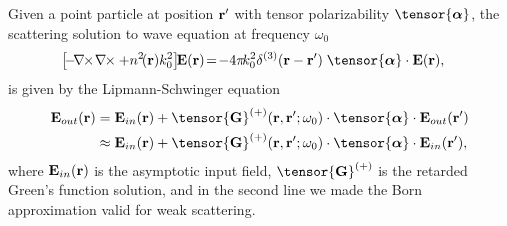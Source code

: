 \documentclass[preprint,aps,pra,onecolumn]{revtex4-1} %
\begin{document}
Given a point particle at position $\mathbf{r}'$ with tensor polarizability $\tensor{\boldsymbol{\alpha}}$, the  scattering solution to wave equation at frequency $\omega_0$
\begin{align}\label{eq:Maxwellwithsource2}
\left[\! -\! \nabla\!\!\times\!\nabla\!\!\times + n^2\!(\br)k_0^2 \right]\!\! \mathbf{E}(\br) &\!=\! -4\pi\! k_0^2 \delta^{(3)}(\br-\br')\;  \tensor{\boldsymbol{\alpha}}\cdot \mathbf{E}(\br),
\end{align}
is given by the Lipmann-Schwinger equation
\begin{align}
\mathbf{E}_{out}(\br) &=\mathbf{E}_{in}(\br)+\tensor{\mathbf{G}}^{(+)}(\br , \br'; \omega_0)\cdot \tensor{\boldsymbol{\alpha}}\cdot \mathbf{E}_{out}(\br')\\
&\approx \mathbf{E}_{in}(\br)+ \tensor{\mathbf{G}}^{(+)}(\br , \br'; \omega_0) \cdot \tensor{\boldsymbol{\alpha}}\cdot \mathbf{E}_{in}(\br'),
\end{align}
where $\mathbf{E}_{in}(\mathbf{r})$ is the asymptotic input field, $\tensor{\mathbf{G}}^{(+)}$ is the retarded Green's function solution, and in the second line we made the Born approximation valid for weak scattering.  
\end{document}
